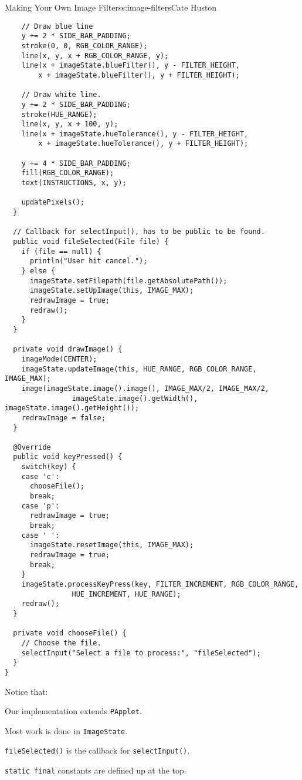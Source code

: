 \begin{aosachapter}{Making Your Own Image Filters}{s:image-filters}{Cate Huston}
\begin{verbatim}
    // Draw blue line
    y += 2 * SIDE_BAR_PADDING;
    stroke(0, 0, RGB_COLOR_RANGE);
    line(x, y, x + RGB_COLOR_RANGE, y);
    line(x + imageState.blueFilter(), y - FILTER_HEIGHT,
        x + imageState.blueFilter(), y + FILTER_HEIGHT);

    // Draw white line.
    y += 2 * SIDE_BAR_PADDING;
    stroke(HUE_RANGE);
    line(x, y, x + 100, y);
    line(x + imageState.hueTolerance(), y - FILTER_HEIGHT,
        x + imageState.hueTolerance(), y + FILTER_HEIGHT);

    y += 4 * SIDE_BAR_PADDING;
    fill(RGB_COLOR_RANGE);
    text(INSTRUCTIONS, x, y);

    updatePixels();
  }

  // Callback for selectInput(), has to be public to be found.
  public void fileSelected(File file) {
    if (file == null) {
      println("User hit cancel.");
    } else {
      imageState.setFilepath(file.getAbsolutePath());
      imageState.setUpImage(this, IMAGE_MAX);
      redrawImage = true;
      redraw();
    }
  }

  private void drawImage() {
    imageMode(CENTER);
    imageState.updateImage(this, HUE_RANGE, RGB_COLOR_RANGE, IMAGE_MAX);
    image(imageState.image().image(), IMAGE_MAX/2, IMAGE_MAX/2, 
                imageState.image().getWidth(), imageState.image().getHeight());
    redrawImage = false;
  }

  @Override
  public void keyPressed() {
    switch(key) {
    case 'c':
      chooseFile();
      break;
    case 'p':
      redrawImage = true;
      break;
    case ' ':
      imageState.resetImage(this, IMAGE_MAX);
      redrawImage = true;
      break;
    }
    imageState.processKeyPress(key, FILTER_INCREMENT, RGB_COLOR_RANGE, 
                HUE_INCREMENT, HUE_RANGE);
    redraw();
  }

  private void chooseFile() {
    // Choose the file.
    selectInput("Select a file to process:", "fileSelected");
  }
}
\end{verbatim}

Notice that:

\begin{aosaitemize}

\item
  Our implementation extends \texttt{PApplet}.
\item
  Most work is done in \texttt{ImageState}.
\item
  \texttt{fileSelected()} is the callback for \texttt{selectInput()}.
\item
  \texttt{static final} constants are defined up at the top.
\end{aosaitemize}


\end{aosachapter}
